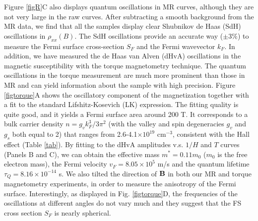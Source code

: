 Figure \ref{figR}C also displays quantum oscillations in MR curves, although they are not very large in the raw curves. After subtracting a smooth background from the MR data, we find that all the samples display clear Shubnikov de Haas (SdH) oscillations in $\rho_{xx}(B)$. The SdH oscillations provide an accurate way ($\pm3\%$) to measure the Fermi surface cross-section $S_F$ and the Fermi wavevector $k_F$. In addition, we have measured the de Haas van Alven (dHvA) oscillations in the magnetic susceptibility with the torque magnetometry technique. The quantum oscillations in the torque measurement are much more prominent than those in MR and can yield information about the sample with high precision. Figure \ref{figtorque}A shows the oscillatory component of the magnetization together with a fit to the standard Lifshitz-Kosevich (LK) expression. The fitting quality is quite good, and it yields a Fermi surface area around 200 T. It corresponds to a bulk carrier density $n = g_vk_F^3/3\pi^2$ (with the valley and spin degeneracies $g_v$ and $g_s$ both equal to 2) that ranges from 2.6-4.1$\times 10^{19}$ cm$^{-3}$, consistent with the Hall effect (Table \ref{tab}). By fitting to the dHvA amplitudes v.s. $1/H$ and $T$ curves (Panels B and C), we can obtain the effective mass $m^* = 0.11 m_0$ ($m_0$ is the free electron mass),  the Fermi velocity $v_F = 8.05\times10^5$ m/s and the quantum lifetime $\tau_Q=8.16\times10^{-14}$ s. We also tilted the direction of $\bf B$ in both our MR and torque magnetometry experiments, in order to measure the anisotropy of the Fermi surface. Interestingly, as displayed in Fig. \ref{figtorque}D, the frequencies of the oscillations at different angles do not vary much and they suggest that the FS cross section $S_F$ is nearly spherical. 

